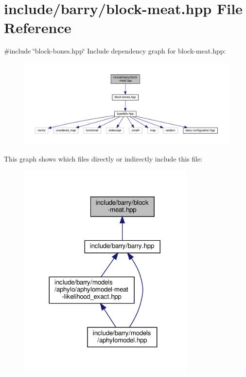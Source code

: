 \hypertarget{block-meat_8hpp}{}\section{include/barry/block-\/meat.hpp File Reference}
\label{block-meat_8hpp}
{\ttfamily \#include \char`\"{}block-\/bones.\+hpp\char`\"{}}\newline
Include dependency graph for block-\/meat.hpp\+:\nopagebreak
\begin{figure}[H]
\begin{center}
\leavevmode
\includegraphics[width=350pt]{block-meat_8hpp__incl}
\end{center}
\end{figure}
This graph shows which files directly or indirectly include this file\+:\nopagebreak
\begin{figure}[H]
\begin{center}
\leavevmode
\includegraphics[width=251pt]{block-meat_8hpp__dep__incl}
\end{center}
\end{figure}
